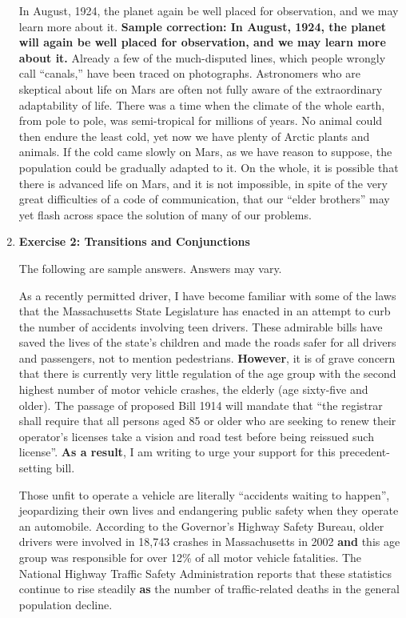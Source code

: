 \begin{enumerate}
In August, 1924, the planet again be well placed for observation, and we may learn more about it. \textbf{Sample correction: In August, 1924, the planet will again be well placed for observation, and we may learn more about it.} Already a few of the much-disputed lines, which people wrongly call ``canals,'' have been traced on photographs. Astronomers who are skeptical about life on Mars are often not fully aware of the extraordinary adaptability of life. There was a time when the climate of the whole earth, from pole to pole, was semi-tropical for millions of years. No animal could then endure the least cold, yet now we have plenty of Arctic plants and animals. If the cold came slowly on Mars, as we have reason to suppose, the population could be gradually adapted to it. On the whole, it is possible that there is advanced life on Mars, and it is not impossible, in spite of the very great difficulties of a code of communication, that our ``elder brothers'' may yet flash across space the solution of many of our problems.

\item \textbf{Exercise 2: Transitions and Conjunctions}

The following are sample answers. Answers may vary.

As a recently permitted driver, I have become familiar with some of the laws that the Massachusetts State Legislature has enacted in an attempt to curb the number of accidents involving teen drivers. These admirable bills have saved the lives of the state's children and made the roads safer for all drivers and passengers, not to mention pedestrians. \textbf{However}, it is of grave concern that there is currently very little regulation of the age group with the second highest number of motor vehicle crashes, the elderly (age sixty-five and older). The passage of proposed Bill 1914 will mandate that ``the registrar shall require that all persons aged 85 or older who are seeking to renew their operator's licenses take a vision and road test before being reissued such license''. \textbf{As a result}, I am writing to urge your support for this precedent-setting bill.  

Those unfit to operate a vehicle are literally ``accidents waiting to happen'', jeopardizing their own lives and endangering public safety when they operate an automobile. According to the Governor's Highway Safety Bureau, older drivers were involved in 18,743 crashes in Massachusetts in 2002 \textbf{and} this age group was responsible for over 12\% of all motor vehicle fatalities. The National Highway Traffic Safety Administration reports that these statistics continue to rise steadily \textbf{as} the number of traffic-related deaths in the general population decline.  
	

\end{enumerate}
